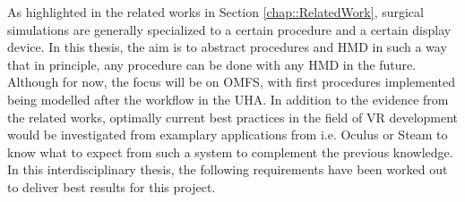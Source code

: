 As highlighted in the related works in Section \ref{chap::RelatedWork}, surgical simulations are generally specialized to a certain procedure and a certain display device.
In this thesis, the aim is to abstract procedures and HMD in such a way that in principle, any procedure can be done with any HMD in the future.
Although for now, the focus will be on OMFS, with first procedures implemented being modelled after the workflow in the UHA.
In addition to the evidence from the related works, optimally current best practices in the field of VR development would be investigated from examplary applications from i.e. Oculus or 
Steam to know what to expect from such a system to complement the previous knowledge.
In this interdisciplinary thesis, the following requirements have been worked out to deliver best results for this project. 

